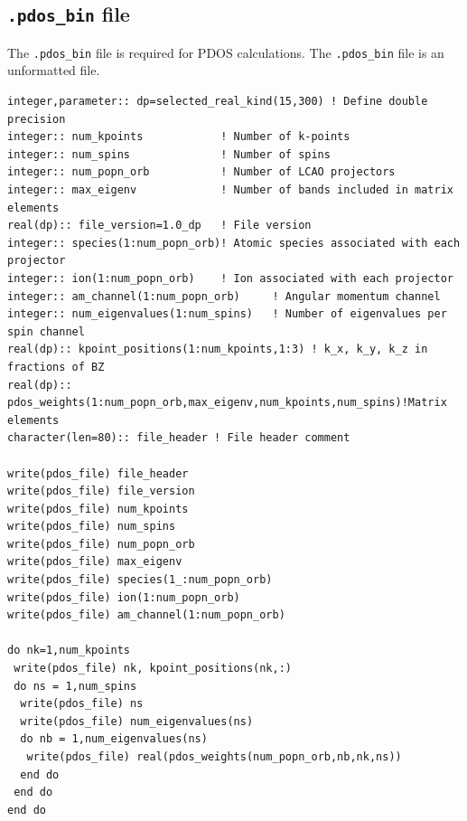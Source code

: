 \documentclass[a4paper,11pt,twoside]{book}
\begin{document}
{\begin{appendix}
\section{\texttt{.pdos\_bin} file}
The \texttt{.pdos\_bin} file is required for PDOS calculations.
%
The \texttt{.pdos\_bin} file is an unformatted file.
\begin{verbatim}
integer,parameter:: dp=selected_real_kind(15,300) ! Define double precision
integer:: num_kpoints            ! Number of k-points
integer:: num_spins              ! Number of spins
integer:: num_popn_orb           ! Number of LCAO projectors
integer:: max_eigenv             ! Number of bands included in matrix elements
real(dp):: file_version=1.0_dp   ! File version
integer:: species(1:num_popn_orb)! Atomic species associated with each projector
integer:: ion(1:num_popn_orb)    ! Ion associated with each projector
integer:: am_channel(1:num_popn_orb)     ! Angular momentum channel
integer:: num_eigenvalues(1:num_spins)   ! Number of eigenvalues per spin channel
real(dp):: kpoint_positions(1:num_kpoints,1:3) ! k_x, k_y, k_z in fractions of BZ
real(dp):: pdos_weights(1:num_popn_orb,max_eigenv,num_kpoints,num_spins)!Matrix elements
character(len=80):: file_header ! File header comment

write(pdos_file) file_header
write(pdos_file) file_version
write(pdos_file) num_kpoints
write(pdos_file) num_spins
write(pdos_file) num_popn_orb
write(pdos_file) max_eigenv
write(pdos_file) species(1_:num_popn_orb)
write(pdos_file) ion(1:num_popn_orb)
write(pdos_file) am_channel(1:num_popn_orb)
       
do nk=1,num_kpoints
 write(pdos_file) nk, kpoint_positions(nk,:)
 do ns = 1,num_spins
  write(pdos_file) ns
  write(pdos_file) num_eigenvalues(ns)
  do nb = 1,num_eigenvalues(ns)
   write(pdos_file) real(pdos_weights(num_popn_orb,nb,nk,ns))
  end do
 end do
end do
\end{verbatim}


\begin{landscape}

\end{landscape}
\end{appendix}}
\end{document}
